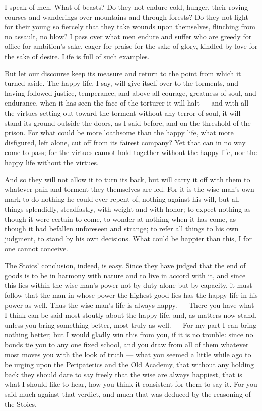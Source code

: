  I speak of men. What of beasts? Do they not endure cold, hunger, their roving courses and wanderings over mountains and through forests? Do they not fight for their young so fiercely that they take wounds upon themselves, flinching from no assault, no blow? I pass over what men endure and suffer who are greedy for office for ambition's sake, eager for praise for the sake of glory, kindled by love for the sake of desire. Life is full of such examples.

 But let our discourse keep its measure and return to the point from which it turned aside. The happy life, I say, will give itself over to the torments, and having followed justice, temperance, and above all courage, greatness of soul, and endurance, when it has seen the face of the torturer it will halt — and with all the virtues setting out toward the torment without any terror of soul, it will stand its ground outside the doors, as I said before, and on the threshold of the prison. For what could be more loathsome than the happy life, what more disfigured, left alone, cut off from its fairest company? Yet that can in no way come to pass; for the virtues cannot hold together without the happy life, nor the happy life without the virtues.

 And so they will not allow it to turn its back, but will carry it off with them to whatever pain and torment they themselves are led. For it is the wise man's own mark to do nothing he could ever repent of, nothing against his will, but all things splendidly, steadfastly, with weight and with honor; to expect nothing as though it were certain to come, to wonder at nothing when it has come, as though it had befallen unforeseen and strange; to refer all things to his own judgment, to stand by his own decisions. What could be happier than this, I for one cannot conceive.

 The Stoics' conclusion, indeed, is easy. Since they have judged that the end of goods is to be in harmony with nature and to live in accord with it, and since this lies within the wise man's power not by duty alone but by capacity, it must follow that the man in whose power the highest good lies has the happy life in his power as well. Thus the wise man's life is always happy. — There you have what I think can be said most stoutly about the happy life, and, as matters now stand, unless you bring something better, most truly as well. — For my part I can bring nothing better; but I would gladly win this from you, if it is no trouble: since no bonds tie you to any one fixed school, and you draw from all of them whatever most moves you with the look of truth — what you seemed a little while ago to be urging upon the Peripatetics and the Old Academy, that without any holding back they should dare to say freely that the wise are always happiest, that is what I should like to hear, how you think it consistent for them to say it. For you said much against that verdict, and much that was deduced by the reasoning of the Stoics.

